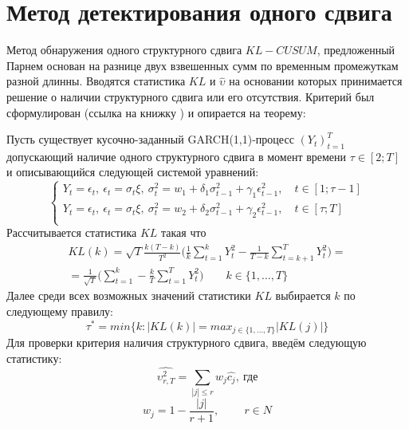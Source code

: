 \documentclass[a4paper,14pt,russian]{extarticle}
\begin{document}
	\section{\label{sec:sec1}Метод детектирования одного сдвига}
	Метод обнаружения одного структурного сдвига $KL-CUSUM$, предложенный Парнем основан на разнице двух взвешенных сумм по временным промежуткам разной длинны. Вводятся статистика $KL$ и $\hat{\upsilon}$ на основании которых принимается решение о наличии структурного сдвига или его отсутствия. Критерий был сформулирован (ссылка на книжку ) и опирается на теорему: 
	\par
	Пусть существует кусочно-заданный GARCH(1,1)-процесс $(Y_t)_{t=1}^T$ допускающий наличие одного структурного сдвига в момент времени $\tau \in \left[2; T\right]$ и описывающийся следующей системой уравнений:
	\begin{equation}
		\begin{cases}
			Y_t = \epsilon_t, \ \epsilon_t = \sigma_t \xi, \ \sigma_t^2 = w_1 + \delta_1 \sigma_{t-1}^2 + \gamma_1 \epsilon_{t-1}^2, \quad t \in \left[1;\tau-1\right] \\
			Y_t = \epsilon_t, \ \epsilon_t = \sigma_t \xi, \ \sigma_t^2 = w_2 + \delta_2 \sigma_{t-1}^2 + \gamma_2 \epsilon_{t-1}^2, \quad t \in \left[\tau;T\right] \\
		\end{cases}
	\end{equation}
	Рассчитывается статистика $KL$ такая что
	\begin{multline}
		KL(k) = \sqrt{T} \frac{k (T - k)}{T^2} \Bigg( \frac{1}{k} \sum_{t=1}^{k} Y_t^2 - \frac{1}{T-k} \sum_{t=k+1}^{T}Y_t^2\Bigg) =\\
		=\frac{1}{\sqrt{T}} \Bigg(\sum_{t=1}^{k} - \frac{k}{T} \sum_{t=1}^{T} Y_t^2\Bigg) \qquad k \in \{1, \dots, T\}
	\end{multline}
	Далее среди всех возможных значений статистики $KL$ выбирается $k$ по следующему правилу:
	\begin{equation}
		\tau^{*} = min\{k: |KL(k)| = max_{j \in \{1, \dots, T\}}|KL(j)| \}
	\end{equation}
	Для проверки критерия наличия структурного сдвига, введём следующую статистику:
	\begin{equation}
		\hat{\upsilon_{r,T}^2} = \sum_{|j| \leq r}^{}w_j\hat{c_j}, \ \text{где}
	\end{equation}
	\begin{equation}
		w_j = 1 - \frac{|j|}{r + 1}, \qquad \ r \in N
	\end{equation}
\end{document}
